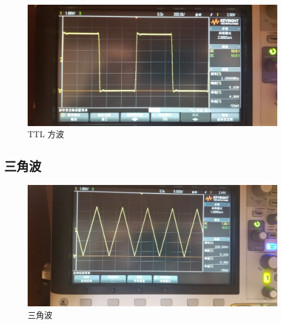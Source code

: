 \documentclass[a4paper]{article}
\begin{document}
	\begin{figure}[H]
		\centering
		\includegraphics[width=0.7\linewidth]{figures/f2}
		\caption{TTL 方波}
	\end{figure}

	\subsection{三角波}

	\begin{figure}[H]
		\centering
		\includegraphics[width=0.7\linewidth]{figures/f3}
		\caption{三角波}
	\end{figure}
\end{document}
